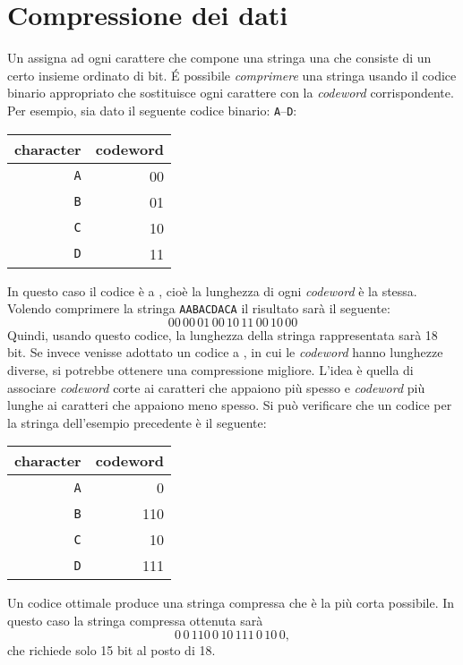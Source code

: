 \section{Compressione dei dati}


Un  assigna ad ogni carattere
che compone una stringa una  che consiste 
di un certo insieme ordinato di bit.
\'{E} possibile \emph{comprimere} una stringa usando il codice 
binario appropriato che sostituisce ogni carattere con la 
\emph{codeword} corrispondente.
Per esempio, sia dato il seguente codice binario:
\texttt{A}–\texttt{D}:
\begin{center}
\begin{tabular}{rr}
character & codeword \\
\hline
\texttt{A} & 00 \\
\texttt{B} & 01 \\
\texttt{C} & 10 \\
\texttt{D} & 11 \\
\end{tabular}
\end{center}
In questo caso il codice è a ,
cioè la lunghezza di ogni \emph{codeword} è la stessa.
Volendo comprimere la stringa
\texttt{AABACDACA} il risultato sarà il seguente:
\[00\,00\,01\,00\,10\,11\,00\,10\,00\]
Quindi, usando questo codice, la lunghezza della
stringa rappresentata sarà 18 bit.
Se invece venisse adottato un codice a 
, in cui le \emph{codeword}
hanno lunghezze diverse, si potrebbe ottenere
una compressione migliore.
L'idea è quella di associare \emph{codeword} corte
ai caratteri che appaiono più spesso e 
\emph{codeword} più lunghe ai caratteri che 
appaiono meno spesso.
Si può verificare che un codice 
per la stringa dell'esempio precedente 
è il seguente:
\begin{center}
\begin{tabular}{rr}
character & codeword \\
\hline
\texttt{A} & 0 \\
\texttt{B} & 110 \\
\texttt{C} & 10 \\
\texttt{D} & 111 \\
\end{tabular}
\end{center}
Un codice ottimale produce una stringa compressa
che è la più corta possibile.
In questo caso la stringa compressa ottenuta sarà
\[0\,0\,110\,0\,10\,111\,0\,10\,0,\]
che richiede solo 15 bit al posto di 18.

